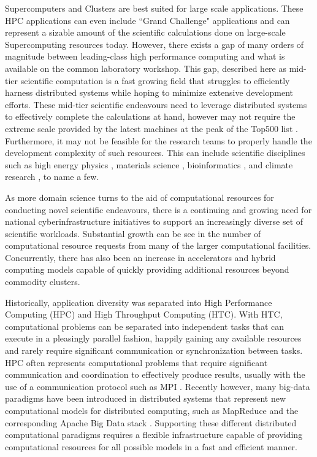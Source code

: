 Supercomputers and Clusters are best suited for large scale applications.  These HPC applications can even include ``Grand Challenge" applications \cite{hoare2005grand} and can represent a sizable amount of the scientific calculations done on large-scale Supercomputing resources today. However, there exists a gap of many orders of magnitude  between leading-class high performance computing and what is available on the common laboratory workshop. This gap, described here as mid-tier scientific computation is a fast growing field that struggles to efficiently harness distributed systems while hoping to minimize extensive development efforts. These mid-tier scientific endeavours need to leverage distributed systems to effectively complete the calculations at hand, however may not require the extreme scale provided by the latest machines at the peak of the Top500 list \cite{www-top500}. Furthermore, it may not be feasible for the research teams to properly handle the development complexity of such resources.  This can include scientific disciplines such as high energy physics \cite{buncic2010cernvm}, materials science \cite{wang2006survey}, bioinformatics \cite{menon2012cloud}, and climate research \cite{He2010nasa}, to name a few.  


As more domain science turns to the aid of computational resources for conducting novel scientific endeavours, there is a continuing and growing need for national cyberinfrastructure initiatives to support an increasingly diverse set of scientific workloads. Substantial growth can be see in the number of computational resource requests \cite{towns2014xsede, antypas2008nersc} from many of the larger computational facilities.  Concurrently, there has also been an increase in accelerators and hybrid computing models capable of quickly providing additional resources \cite{vetter2011keeneland} beyond commodity clusters.

Historically, application diversity was separated into High Performance Computing (HPC) and High Throughput Computing (HTC).  With HTC, computational problems can be separated into independent tasks that can execute in a pleasingly parallel fashion, happily gaining any available resources and rarely require significant communication or synchronization between tasks. HPC often represents computational problems that require significant communication and coordination to effectively produce results, usually with the use of a communication protocol such as MPI \cite{mpi}.  Recently however, many big-data paradigms \cite{agrawal2011big} have been introduced in distributed systems that represent new computational models for distributed computing, such as MapReduce \cite{dean2008mapreduce} and the corresponding Apache Big Data stack \cite{kamburugamuve2013survey, chen2014big}. Supporting these different distributed computational paradigms requires a flexible infrastructure capable of providing computational resources for all possible models in a fast and efficient manner.

